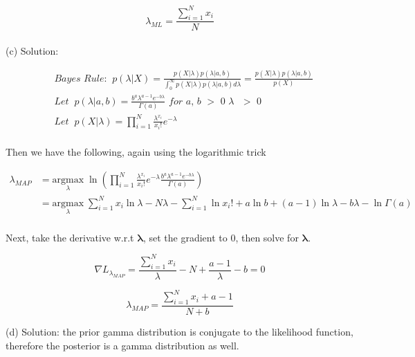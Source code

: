 \documentclass[11pt]{report}
\begin{document}
\begin{equation*}
\lambda_{ML} = {\frac{\sum_{i=1}^N{x_i}}{N}}
\end{equation*}
\\

\justify
(c) Solution: 

\begin{align*} 
& \textit{Bayes Rule:} \;\;  p(\lambda|X) = \frac{p(X|\lambda) p(\lambda|a,b)}{\int_{0}^{\infty} p(X|\lambda) p(\lambda|a,b) d\lambda} = \frac{p(X|\lambda) p(\lambda|a,b)}{p(X)} \\
&\textit{Let} \;\; p(\lambda|a, b)  = \frac{b^a\lambda^{a-1}e^{-b\lambda}}{\Gamma(a)} \textit{ for a, b $>$ 0 $\lambda$ $>$ 0} \\
&\textit{Let} \;\; p(X|\lambda) = \prod_{i=1}^N\frac{\lambda^{x_i}}{x_i!} e^{-\lambda} \\
\end{align*}

\justify
Then we have the following, again using the logarithmic trick

\begin{equation*}
\begin{split}
\lambda_{MAP} & = \underset{\lambda}{\mathrm{argmax}} \; \ln{(\prod_{i=1}^N\frac{\lambda^{x_i}}{x_i!} e^{-\lambda} \frac{b^a\lambda^{a-1}e^{-b\lambda}}{\Gamma(a)})} \\
& = \underset{\lambda}{\mathrm{argmax}} \; {\sum_{i=1}^N{x_i}\ln{\lambda} }  - {N\lambda}  -  {\sum_{i=1}^N\ln{x_i!}} + a\ln{b} + (a-1)\ln{\lambda} - b\lambda - \ln{\Gamma(a)}\\
\end{split}
\end{equation*}

\justify
Next, take the derivative w.r.t $\boldsymbol{\lambda}$, set the gradient to 0, then solve for $\boldsymbol{\lambda}$.

\begin{equation*}
\nabla{L_{\lambda_{MAP}}} = {\frac{\sum_{i=1}^N{x_i}}{\lambda}} - N + \frac{a-1}{\lambda} - b = 0
\end{equation*}

\begin{equation*}
\lambda_{MAP} = \frac{{\sum_{i=1}^N{x_i}} + a - 1}{N + b}
\end{equation*}

 \pagebreak

\justify
(d) Solution: the prior gamma distribution is conjugate to the likelihood function, therefore the posterior is a gamma distribution as well. 
\end{document}
